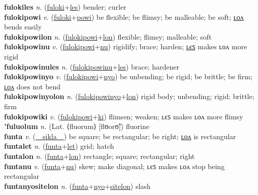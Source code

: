\textbf{fulokiles} \textit{n.} (\hyperref[fuloki]{fuloki}+\hyperref[les]{les})
bender; curler \label{fulokiles} \\
\textbf{fulokipowi} \textit{v.} (\hyperref[fuloki]{fuloki}+\hyperref[powi]{powi})
be flexible; be flimsy; be malleable; be soft; \hyperref[fulokipowilon]{ʟᴏᴧ} bends easily \label{fulokipowi} \\
\textbf{fulokipowilon} \textit{n.} (\hyperref[fulokipowi]{fulokipowi}+\hyperref[lon]{lon})
flexible; flimsy; malleable; soft \label{fulokipowilon} \\
\textbf{fulokipowinu} \textit{v.} (\hyperref[fulokipowi]{fulokipowi}+\hyperref[nu]{nu})
rigidify; brace; harden; \hyperref[fulokipowinules]{ʟєꜱ} makes ʟᴏᴧ more rigid \label{fulokipowinu} \\
\textbf{fulokipowinules} \textit{n.} (\hyperref[fulokipowinu]{fulokipowinu}+\hyperref[les]{les})
brace; hardener \label{fulokipowinules} \\
\textbf{fulokipowinyo} \textit{v.} (\hyperref[fulokipowi]{fulokipowi}+\hyperref[nyo]{nyo})
be unbending; be rigid; be brittle; be firm; \hyperref[fulokipowinyolon]{ʟᴏᴧ} does not bend \label{fulokipowinyo} \\
\textbf{fulokipowinyolon} \textit{n.} (\hyperref[fulokipowinyo]{fulokipowinyo}+\hyperref[lon]{lon})
rigid body; unbending; rigid; brittle; firm \label{fulokipowinyolon} \\
\textbf{fulokipowiki} \textit{v.} (\hyperref[fulokipowi]{fulokipowi}+\hyperref[ki]{ki})
flimsen; weaken; ʟєꜱ makes ʟᴏᴧ more flimsy \label{fulokipowiki} \\
\textbf{'fuluolum} \textit{n.} (Lat. ⟨fluorum⟩ [flʊorʊ̃])
fluorine \label{'fuluolum} \\
\textbf{funta} \textit{v.} (\hyperref[sikla]{~~sikla~~})
be square; be rectangular; be right; \hyperref[funtalon]{ʟᴏᴧ} is rectangular \label{funta} \\
\textbf{funtalet} \textit{n.} (\hyperref[funta]{funta}+\hyperref[let]{let})
grid; hatch \label{funtalet} \\
\textbf{funtalon} \textit{n.} (\hyperref[funta]{funta}+\hyperref[lon]{lon})
rectangle; square; rectangular; right \label{funtalon} \\
\textbf{funtanu} \textit{v.} (\hyperref[funta]{funta}+\hyperref[nu]{nu})
skew; make diagonal; ʟєꜱ makes ʟᴏᴧ stop being rectangular \label{funtanu} \\
\textbf{funtanyositelon} \textit{n.} (\hyperref[funta]{funta}+\hyperref[nyo]{nyo}+\hyperref[sitelon]{sitelon})
slash \label{funtanyositelon} \\
